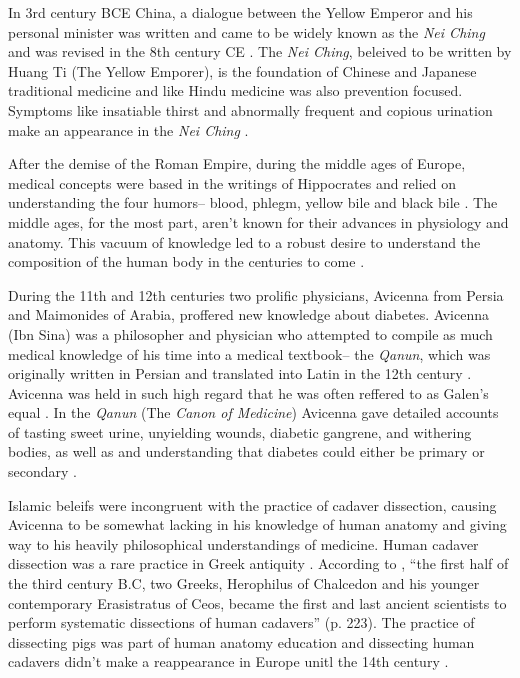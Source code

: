 \documentclass[12pt]{article}
\begin{document}
In 3rd century BCE China, a dialogue between the Yellow Emperor and his personal minister was written and came to be widely known as the \textit{Nei Ching} and was revised in the 8th century CE \citep{veith_1950_huang}. The \textit{Nei Ching}, beleived to be written by Huang Ti (The Yellow Emporer), is the foundation of Chinese and Japanese traditional medicine and like Hindu medicine was also prevention focused. Symptoms like insatiable thirst and abnormally frequent and copious urination make an appearance in the \textit{Nei Ching} \citep{veith_1950_huang}. 

After the demise of the Roman Empire, during the middle ages of Europe, medical concepts were based in the writings of Hippocrates and relied on understanding the four humors-- blood, phlegm, yellow bile and black bile \citep{lloyd_1983_hippocratic}. The middle ages, for the most part, aren't known for their advances in physiology and anatomy. This vacuum of knowledge led to a robust desire to understand the composition of the human body in the centuries to come \citep{sanders_2001_philatelic}. 

During the 11th and 12th centuries two prolific physicians, Avicenna from Persia and Maimonides of Arabia, proffered new knowledge about diabetes. Avicenna (Ibn Sina) was a philosopher and physician who attempted to compile as much medical knowledge of his time into a medical textbook-- the \textit{Qanun}, which was originally written in Persian and translated into Latin in the 12th century \citep{avicenna_1930_treatise}. Avicenna was held in such high regard that he was often reffered to as Galen's equal \citep{sanders_2001_philatelic}. In the \textit{Qanun} (The \textit{Canon of Medicine}) Avicenna gave detailed accounts of tasting sweet urine, unyielding wounds, diabetic gangrene, and withering bodies, as well as and understanding that diabetes could either be primary or secondary \citep{avicenna_1930_treatise}. 

Islamic beleifs were incongruent with the practice of cadaver dissection, causing Avicenna to be somewhat lacking in his knowledge of human anatomy and giving way to his heavily philosophical understandings of medicine. Human cadaver dissection was a rare practice in Greek antiquity \citep{sanders_2001_diabetes}. According to \citet{von_1992_discovery}, ``the first half of the third century B.C, two Greeks, Herophilus of Chalcedon and his younger contemporary Erasistratus of Ceos, became the first and last ancient scientists to perform systematic dissections of human cadavers'' (p. 223). The practice of dissecting pigs was part of human anatomy education and dissecting human cadavers didn't make a reappearance in Europe unitl the 14th century \citep{von_1992_discovery}. 
\end{document}
